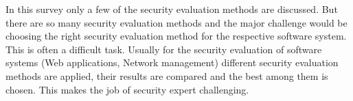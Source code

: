 \documentclass[pdftex,english,oribibl]{llncs}
\begin{document}
In this survey only a few of the security evaluation methods are discussed. But there are so many security evaluation methods and the major challenge would be choosing the right security evaluation method for the respective software system. This is often a difficult task. Usually for the security evaluation of software systems (Web applications, Network management) different security evaluation methods are applied, their results are compared and the best among them is chosen. This makes the job of security expert challenging.  


\end{document}
